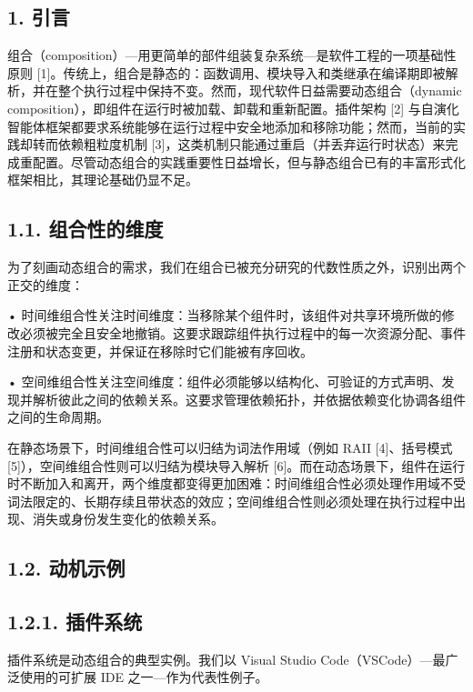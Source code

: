 \subsection{1. 引言}\label{introduction}

组合（composition）---用更简单的部件组装复杂系统---是软件工程的一项基础性原则 {[}1{]}。传统上，组合是静态的：函数调用、模块导入和类继承在编译期即被解析，并在整个执行过程中保持不变。然而，现代软件日益需要动态组合（dynamic composition），即组件在运行时被加载、卸载和重新配置。插件架构 {[}2{]} 与自演化智能体框架都要求系统能够在运行过程中安全地添加和移除功能；然而，当前的实践却转而依赖粗粒度机制 {[}3{]}，这类机制只能通过重启（并丢弃运行时状态）来完成重配置。尽管动态组合的实践重要性日益增长，但与静态组合已有的丰富形式化框架相比，其理论基础仍显不足。

\subsection{1.1. 组合性的维度}\label{dimensions-of-composability}

为了刻画动态组合的需求，我们在组合已被充分研究的代数性质之外，识别出两个正交的维度：

• 时间维组合性关注时间维度：当移除某个组件时，该组件对共享环境所做的修改必须被完全且安全地撤销。这要求跟踪组件执行过程中的每一次资源分配、事件注册和状态变更，并保证在移除时它们能被有序回收。

• 空间维组合性关注空间维度：组件必须能够以结构化、可验证的方式声明、发现并解析彼此之间的依赖关系。这要求管理依赖拓扑，并依据依赖变化协调各组件之间的生命周期。

在静态场景下，时间维组合性可以归结为词法作用域（例如 RAII {[}4{]}、括号模式 {[}5{]}），空间维组合性则可以归结为模块导入解析 {[}6{]}。而在动态场景下，组件在运行时不断加入和离开，两个维度都变得更加困难：时间维组合性必须处理作用域不受词法限定的、长期存续且带状态的效应；空间维组合性则必须处理在执行过程中出现、消失或身份发生变化的依赖关系。

\subsection{1.2. 动机示例}\label{motivating-examples}

\subsection{1.2.1. 插件系统}\label{plugin-systems}

插件系统是动态组合的典型实例。我们以 Visual Studio Code（VSCode）---最广泛使用的可扩展 IDE 之一---作为代表性例子。

